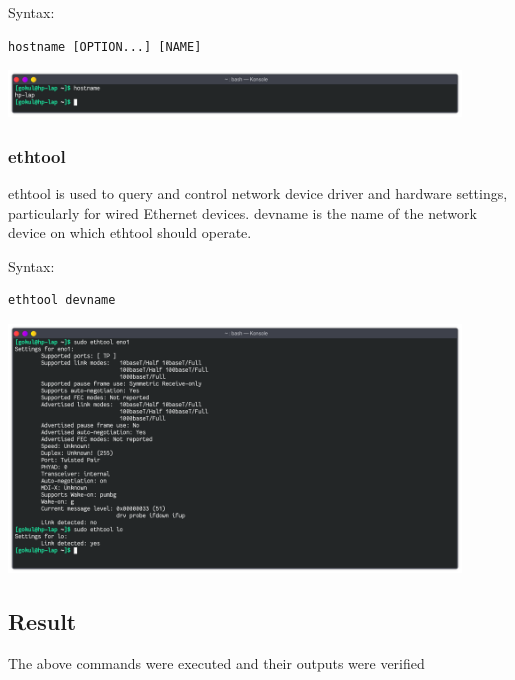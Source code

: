 Syntax:
\begin{lstlisting}
hostname [OPTION...] [NAME]
\end{lstlisting}

\begin{center}
	\includegraphics[width=0.90\textwidth]{img/p1/ss7.png}
\end{center}


\subsubsection{ethtool}
ethtool is used to query and control network device driver and hardware settings, particularly for wired Ethernet devices.
devname is the name of the network device on which ethtool should operate.
\linebreak[2]

Syntax:
\begin{lstlisting}
ethtool devname
\end{lstlisting}

\begin{center}
	\includegraphics[width=0.90\textwidth]{img/p1/ss8.png}
\end{center}

\subsection{Result}
The above commands were executed and their outputs were verified